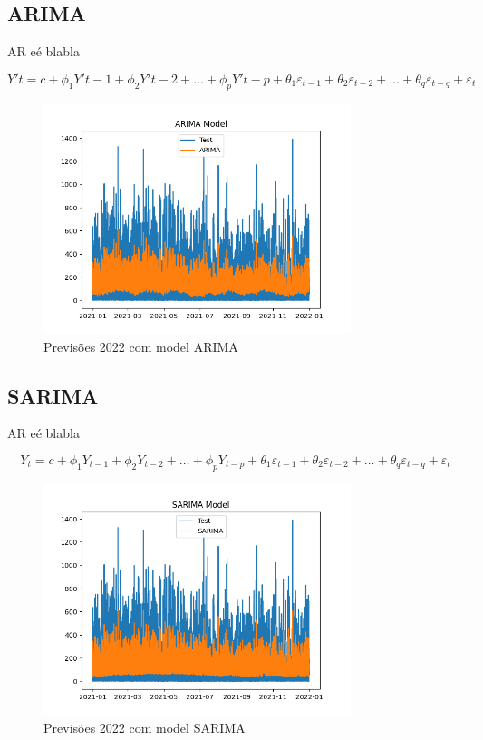 \subsection{ARIMA}

AR eé blabla

\begin{equation} \label{eq:ARIMA} Y't = c + \phi_1 Y'{t-1} + \phi_2 Y'{t-2} + \dots + \phi_p Y'{t-p} + \theta_1 \varepsilon_{t-1} + \theta_2 \varepsilon_{t-2} + \dots + \theta_q \varepsilon_{t-q} + \varepsilon_t \end{equation}

\begin{figure}[H]
    \centering
    \includegraphics[width=0.8\textwidth]{../plots/ARIMA_model.png}
    \caption{Previsões 2022 com model ARIMA}
    \label{fig:ARIMA_model}
\end{figure}

\subsection{SARIMA}

AR eé blabla

\begin{equation} \label{eq:SARIMA} Y_t = c + \phi_1 Y_{t-1} + \phi_2 Y_{t-2} + \dots + \phi_p Y_{t-p} + \theta_1 \varepsilon_{t-1} + \theta_2 \varepsilon_{t-2} + \dots + \theta_q \varepsilon_{t-q} + \varepsilon_t \end{equation}

\begin{figure}[H]
    \centering
    \includegraphics[width=0.8\textwidth]{../plots/SARIMA_model.png}
    \caption{Previsões 2022 com model SARIMA}
    \label{fig:SARIMA_model}
\end{figure}


